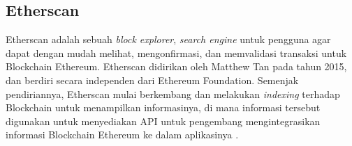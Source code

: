 \subsection{Etherscan}
\label{subsec:etherscan}

Etherscan adalah sebuah \textit{block explorer}, \textit{search engine} untuk pengguna agar dapat dengan mudah melihat, mengonfirmasi, dan memvalidasi transaksi untuk Blockchain Ethereum. Etherscan didirikan oleh Matthew Tan pada tahun 2015, dan berdiri secara independen dari Ethereum Foundation. Semenjak pendiriannya, Etherscan mulai berkembang dan melakukan \textit{indexing} terhadap Blockchain untuk menampilkan informasinya, di mana informasi tersebut digunakan untuk menyediakan API untuk pengembang mengintegrasikan informasi Blockchain Ethereum ke dalam aplikasinya \parencite{etherscan2024}.